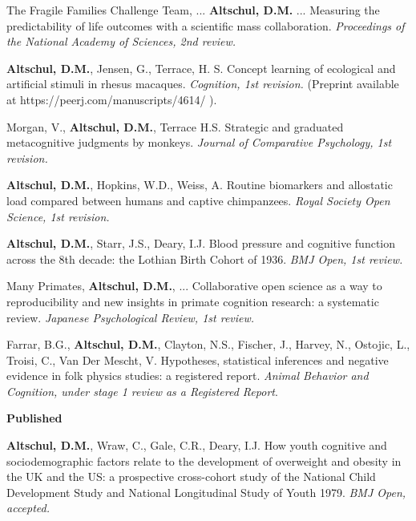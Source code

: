 \documentclass[margin,line]{res}
\begin{document}
\begin{resume}
The Fragile Families Challenge Team, ... {\bf Altschul, D.M.} ... Measuring the predictability of life outcomes with a scientific mass collaboration. {\it Proceedings of the National Academy of Sciences, 2nd review.}

{\bf Altschul, D.M.}, Jensen, G.,  Terrace, H. S. Concept learning of ecological and artificial stimuli in rhesus macaques. {\it Cognition, 1st revision.} (Preprint available at https://peerj.com/manuscripts/4614/ ).

Morgan, V., {\bf Altschul, D.M.}, Terrace H.S. Strategic and graduated metacognitive judgments by monkeys.  {\it Journal of Comparative Psychology, 1st revision.}

{\bf Altschul, D.M.}, Hopkins, W.D., Weiss, A. Routine biomarkers and allostatic load compared between humans and captive chimpanzees. {\it  Royal Society Open Science, 1st revision.}

{\bf Altschul, D.M.}, Starr, J.S., Deary, I.J. Blood pressure and cognitive function across the 8th decade: the Lothian Birth Cohort of 1936. {\it BMJ Open, 1st review.}

Many Primates, {\bf Altschul, D.M.}, ... Collaborative open science as a way to reproducibility and new insights in primate cognition research: a systematic review. {\it Japanese Psychological Review, 1st review.}

Farrar, B.G., {\bf Altschul, D.M.}, Clayton, N.S., Fischer, J., Harvey, N., Ostojic, L., Troisi, C., Van Der Mescht, V. Hypotheses, statistical inferences and negative evidence in folk physics studies: a registered report. {\it Animal Behavior and Cognition, under stage 1 review as a Registered Report}.



\vspace{0.2cm}

{\bf Published}

{\bf Altschul, D.M.}, Wraw, C., Gale, C.R., Deary, I.J. How youth cognitive and sociodemographic factors relate to the development of overweight and obesity in the UK and the US: a prospective cross-cohort study of the National Child Development Study and National Longitudinal Study of Youth 1979. {\it BMJ Open, accepted.}


\end{resume}
\end{document}
